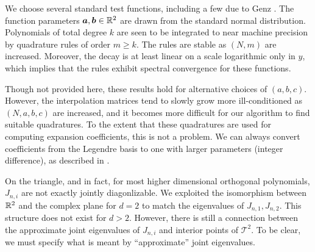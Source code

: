 We choose several standard test functions, including a few due to Genz \cite{genz}. The function parameters $\boldsymbol{a},\boldsymbol{b} \in \mathbb{R}^2$ are drawn from the standard normal distribution. Polynomials of total degree $k$ are seen to be integrated to near machine precision by quadrature rules of order $m \geq k$. The rules are stable as $(N,m)$ are increased. Moreover, the decay is at least linear on a scale logarithmic only in $y$, which implies that the rules exhibit spectral convergence for these functions. 

Though not provided here, these results hold for alternative choices of $(a,b,c)$. However, the interpolation matrices tend to slowly grow more ill-conditioned as $(N,a,b,c)$ are increased, and it becomes more difficult for our algorithm to find suitable quadratures. To the extent that these quadratures are used for computing expansion coefficients, this is not a problem. We can always convert coefficients from the Legendre basis to one with larger parameters (integer difference), as described in .

On the triangle, and in fact, for most higher dimensional orthogonal polynomials, $J_{n,i}$ are not exactly jointly diagonlizable. We exploited the isomorphism between $\mathbb{R}^2$ and the complex plane for $d=2$ to match the eigenvalues of $J_{n,1},J_{n,2}$. This structure does not exist for $d>2$. However, there is still a connection between the approximate joint eigenvalues of $J_{n,i}$ and interior points of $\mathcal{T}^2$. To be clear, we must specify what is meant by ``approximate'' joint eigenvalues. 

